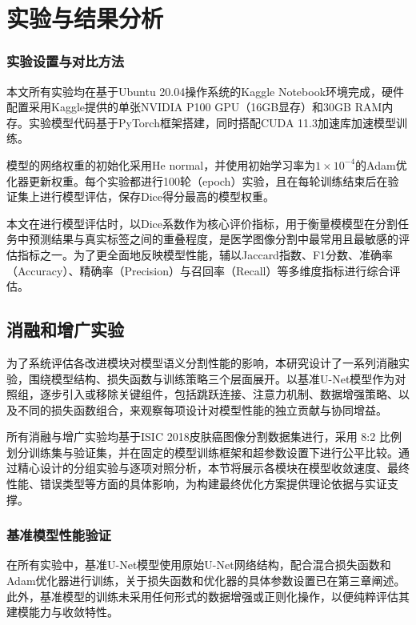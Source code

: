 \section{实验与结果分析}

\subsubsection{实验设置与对比方法}

本文所有实验均在基于Ubuntu 20.04操作系统的Kaggle Notebook环境完成，硬件配置采用Kaggle提供的单张NVIDIA P100 GPU（16GB显存）和30GB RAM内存。实验模型代码基于PyTorch框架搭建，同时搭配CUDA 11.3加速库加速模型训练。

模型的网络权重的初始化采用He normal，并使用初始学习率为$1 \times 10^{-4}$的Adam优化器更新权重。每个实验都进行100轮（epoch）实验，且在每轮训练结束后在验证集上进行模型评估，保存Dice得分最高的模型权重。

本文在进行模型评估时，以Dice系数作为核心评价指标，用于衡量模模型在分割任务中预测结果与真实标签之间的重叠程度，是医学图像分割中最常用且最敏感的评估指标之一。为了更全面地反映模型性能，辅以Jaccard指数、F1分数、准确率（Accuracy）、精确率（Precision）与召回率（Recall）等多维度指标进行综合评估。

\subsection{消融和增广实验}

为了系统评估各改进模块对模型语义分割性能的影响，本研究设计了一系列消融实验，围绕模型结构、损失函数与训练策略三个层面展开。以基准U-Net模型作为对照组，逐步引入或移除关键组件，包括跳跃连接、注意力机制、数据增强策略、以及不同的损失函数组合，来观察每项设计对模型性能的独立贡献与协同增益。

所有消融与增广实验均基于ISIC 2018皮肤癌图像分割数据集进行，采用 8:2 比例划分训练集与验证集，并在固定的模型训练框架和超参数设置下进行公平比较。通过精心设计的分组实验与逐项对照分析，本节将展示各模块在模型收敛速度、最终性能、错误类型等方面的具体影响，为构建最终优化方案提供理论依据与实证支撑。

\subsubsection{基准模型性能验证}

在所有实验中，基准U-Net模型使用原始U-Net网络结构，配合混合损失函数和Adam优化器进行训练，关于损失函数和优化器的具体参数设置已在第三章阐述。此外，基准模型的训练未采用任何形式的数据增强或正则化操作，以便纯粹评估其建模能力与收敛特性。

